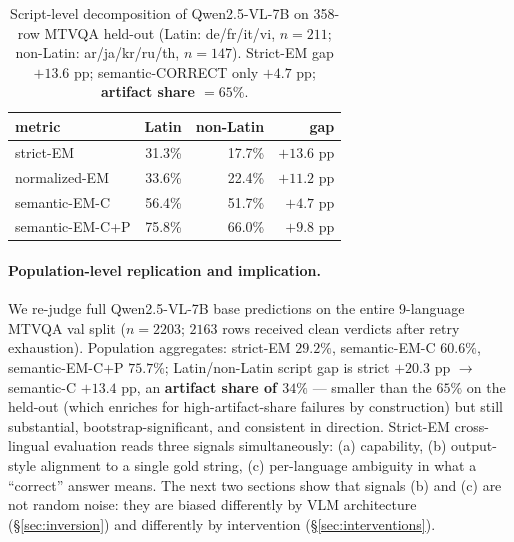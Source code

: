 \begin{table}[t]
\centering
\small
\begin{tabular}{lrrr}
\toprule
metric & Latin & non-Latin & gap \\
\midrule
strict-EM       & 31.3\% & 17.7\% & $+13.6$ pp \\
normalized-EM   & 33.6\% & 22.4\% & $+11.2$ pp \\
semantic-EM-C   & 56.4\% & 51.7\% & $+4.7$ pp \\
semantic-EM-C+P & 75.8\% & 66.0\% & $+9.8$ pp \\
\bottomrule
\end{tabular}
\caption{Script-level decomposition of Qwen2.5-VL-7B on 358-row MTVQA held-out (Latin: de/fr/it/vi, $n=211$; non-Latin: ar/ja/kr/ru/th, $n=147$). Strict-EM gap $+13.6$ pp; semantic-CORRECT only $+4.7$ pp; \textbf{artifact share $=65\%$}.}
\label{tab:script-gap-mtvqa}
\end{table}

\paragraph{Population-level replication and implication.}
We re-judge full Qwen2.5-VL-7B base predictions on the entire 9-language MTVQA val split ($n=2203$; $2163$ rows received clean verdicts after retry exhaustion). Population aggregates: strict-EM $\mathbf{29.2\%}$, semantic-EM-C $\mathbf{60.6\%}$, semantic-EM-C+P $\mathbf{75.7\%}$; Latin/non-Latin script gap is strict $+20.3$ pp $\to$ semantic-C $+13.4$ pp, an \textbf{artifact share of $34\%$} --- smaller than the $65\%$ on the held-out (which enriches for high-artifact-share failures by construction) but still substantial, bootstrap-significant, and consistent in direction. Strict-EM cross-lingual evaluation reads three signals simultaneously: (a) capability, (b) output-style alignment to a single gold string, (c) per-language ambiguity in what a ``correct'' answer means. The next two sections show that signals (b) and (c) are not random noise: they are biased differently by VLM architecture (\S\ref{sec:inversion}) and differently by intervention (\S\ref{sec:interventions}).
